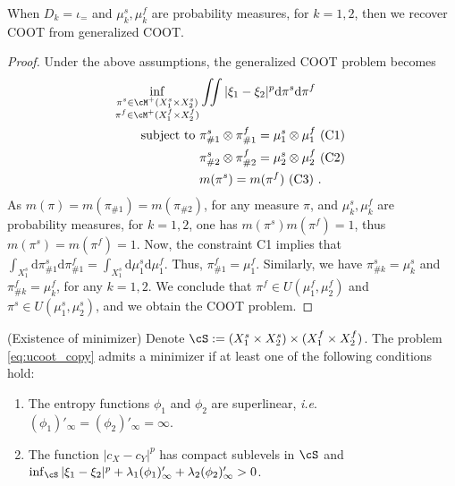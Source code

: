 \begin{claim}
  When $D_k = \iota_{=}$ and $\mu_k^s, \mu_k^f$ are probability measures, for $k=1,2$,
  then we recover COOT from generalized COOT.
\end{claim}
\begin{proof}
  Under the above assumptions, the generalized COOT problem becomes
  \begin{equation*}
    \begin{split}
      \inf_{\substack{\pi^s \in \cM^+(X_1^s \times X_2^s) \\
      \pi^f \in \cM^+(X_1^f \times X_2^f)}}
      &\iint |\xi_1 - \xi_2|^p \mathrm d\pi^s \mathrm d \pi^f \\
      \text{subject to } &\pi^s_{\#1} \otimes \pi^f_{\#1} = \mu_1^s \otimes \mu_1^f \text{ (C1) } \\
      & \pi^s_{\#2} \otimes \pi^f_{\#2} = \mu_2^s \otimes \mu_2^f \text{ (C2) } \\
      & m(\pi^s) = m(\pi^f) \text{ (C3) }.
    \end{split}
  \end{equation*}
  As $m(\pi) = m(\pi_{\#1}) = m(\pi_{\#2})$,
  for any measure $\pi$, and $\mu_k^s, \mu_k^f$ are probability measures, for $k=1,2$,
  one has $m(\pi^s) m(\pi^f) = 1$, thus $m(\pi^s) = m(\pi^f) = 1$.
  Now, the constraint C1 implies that
  $\int_{X_1^s} \mathrm d\pi^s_{\#1} \mathrm d \pi^f_{\#1}
  = \int_{X_1^s} \mathrm d\mu_1^s \mathrm d\mu_1^f$. Thus, $\pi^f_{\#1} = \mu_1^f$.
  Similarly, we have $\pi^s_{\#k} = \mu_k^s$ and $\pi^f_{\#k} = \mu_k^f$, for any $k=1,2$.
  We conclude that $\pi^f \in U(\mu_1^f, \mu_2^f)$ and $\pi^s \in U(\mu_1^s, \mu_2^s)$,
  and we obtain the COOT problem.
\end{proof}

\begin{proposition}
    \label{eq:ucoot_existence_copy}
  (Existence of minimizer) Denote
  $\cS := (X_1^s \times X_2^s) \times (X_1^f \times X_2^f)$.
  The problem \ref{eq:ucoot_copy} admits a minimizer if at least one of
  the following conditions hold:
  \begin{enumerate}
    \item The entropy functions $\phi_1$ and $\phi_2$ are superlinear, \textit{i.e}.
    $(\phi_1)'_{\infty} = (\phi_2)'_{\infty} = \infty$.
    \item The function $\vert c_X - c_Y \vert^p$ has compact sublevels in $\cS$ and
    $\inf_{\cS} \vert \xi_1 - \xi_2 \vert^p + \lambda_1 (\phi_1)'_{\infty} + \lambda_2 (\phi_2)'_{\infty} > 0$.
  \end{enumerate}
\end{proposition}

